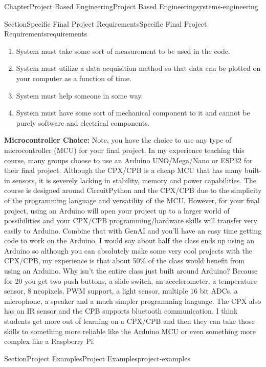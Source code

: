\documentclass[oneside,10pt,]{book}
\newcommand{\terminology}[1]{\textbf{#1}}
\numberwithin{equation}{section}
\begin{document}
\begin{chapterptx}{Chapter}{Project Based Engineering}{}{Project Based Engineering}{}{}{systems-engineering}
\begin{sectionptx}{Section}{Specific Final Project Requirements}{}{Specific Final Project Requirements}{}{}{requirements}
\begin{enumerate}
\item{}System must take some sort of measurement to be used in the code.%
\item{}System must utilize a data acquisition method so that data can be plotted on your computer as a function of time.%
\item{}System must help someone in some way.%
\item{}System must have some sort of mechanical component to it and cannot be purely software and electrical components.%
\end{enumerate}
%
\par
\terminology{Microcontroller Choice:} Note, you have the choice to use any type of microcontroller (MCU) for your final project. In my experience teaching this course, many groups choose to use an Arduino UNO\slash{}Mega\slash{}Nano or ESP32 for their final project. Although the CPX\slash{}CPB is a cheap MCU that has many built-in sensors, it is severely lacking in stability, memory and power capabilities. The course is designed around CircuitPython and the CPX\slash{}CPB due to the simplicity of the programming language and versatility of the MCU. However, for your final project, using an Arduino will open your project up to a larger world of possibilities and your CPX\slash{}CPB programming\slash{}hardware skills will transfer very easily to Arduino. Combine that with GenAI and you’ll have an easy time getting code to work on the Arduino. I would say about half the class ends up using an Arduino so although you can absolutely make some very cool projects with the CPX\slash{}CPB, my experience is that about 50\% of the class would benefit from using an Arduino. Why isn’t the entire class just built around Arduino? Because for \textdollar{}20 you get two push buttons, a slide switch, an accelerometer, a temperature sensor, 8 neopixels, PWM support, a light sensor, multiple 16 bit ADCs, a microphone, a speaker and a much simpler programming language. The CPX also has an IR sensor and the CPB supports bluetooth communication. I think students get more out of learning on a CPX\slash{}CPB and then they can take those skills to something more reliable like the Arduino MCU or even something more complex like a Raspberry Pi.%
\end{sectionptx}
%
%
\typeout{************************************************}
\typeout{************************************************}
%
\begin{sectionptx}{Section}{Project Examples}{}{Project Examples}{}{}{project-examples}

\end{sectionptx}
\end{chapterptx}
\end{document}
